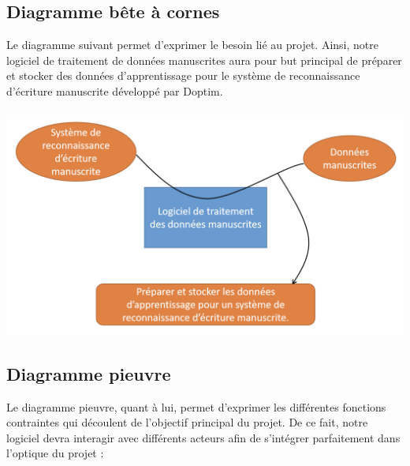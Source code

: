 \subsection{Diagramme bête à cornes}

Le diagramme suivant permet d’exprimer le besoin lié au projet. Ainsi, notre logiciel de
traitement de données manuscrites aura pour but principal de préparer et stocker des données
d’apprentissage pour le système de reconnaissance d’écriture manuscrite développé par Doptim.

\paragraph{}
\begin{mdframed}
\begin{center}
\includegraphics[width=0.7\linewidth]{bete-a-cornes.png}
\end{center}
\end{mdframed}

\subsection{Diagramme pieuvre}

Le diagramme pieuvre, quant à lui, permet d’exprimer les différentes fonctions contraintes
qui découlent de l’objectif principal du projet. De ce fait, notre logiciel devra interagir
avec différents acteurs afin de s’intégrer parfaitement dans l’optique du projet :

